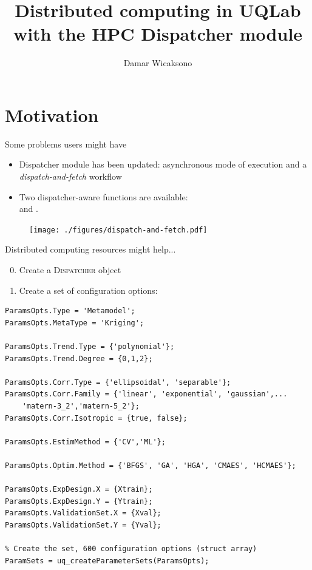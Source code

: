 \documentclass[]{rsuqbeamernew}
\title[]{Distributed computing in UQLab\\with the HPC Dispatcher module}
\author[D. Wicaksono]{Damar Wicaksono}
\institute[RSUQ, ETH Z\"urich]{Chair of Risk, Safety and Uncertainty 
Quantification -- ETH Z\"urich}
\date[09.05.2019]
\begin{document}

\section{Motivation}

\begin{frame}{Some problems users might have}

\begin{itemize}
  \item Dispatcher module has been updated: asynchronous mode of execution and 
        a \emph{dispatch-and-fetch} workflow
  \item Two dispatcher-aware functions are available:\\
         and .
\end{itemize}

\begin{figure}
  \centering
  \texttt{[image: ./figures/dispatch-and-fetch.pdf]}
\end{figure}

\end{frame}


\begin{frame}[fragile]{Distributed computing resources might help...}

\begin{enumerate}
  \setcounter{enumi}{-1}
  \item Create a \textsc{Dispatcher} object
  \item Create a set of configuration options:
\end{enumerate}
\begin{lstlisting}[basicstyle=\scriptsize,numbers=none]
ParamsOpts.Type = 'Metamodel';
ParamsOpts.MetaType = 'Kriging';

ParamsOpts.Trend.Type = {'polynomial'};
ParamsOpts.Trend.Degree = {0,1,2};

ParamsOpts.Corr.Type = {'ellipsoidal', 'separable'};
ParamsOpts.Corr.Family = {'linear', 'exponential', 'gaussian',...
    'matern-3_2','matern-5_2'};
ParamsOpts.Corr.Isotropic = {true, false};

ParamsOpts.EstimMethod = {'CV','ML'};
  
ParamsOpts.Optim.Method = {'BFGS', 'GA', 'HGA', 'CMAES', 'HCMAES'};
  
ParamsOpts.ExpDesign.X = {Xtrain};
ParamsOpts.ExpDesign.Y = {Ytrain};
ParamsOpts.ValidationSet.X = {Xval};
ParamsOpts.ValidationSet.Y = {Yval};

% Create the set, 600 configuration options (struct array)
ParamSets = uq_createParameterSets(ParamsOpts); 
\end{lstlisting}

\end{frame}
\end{document}
